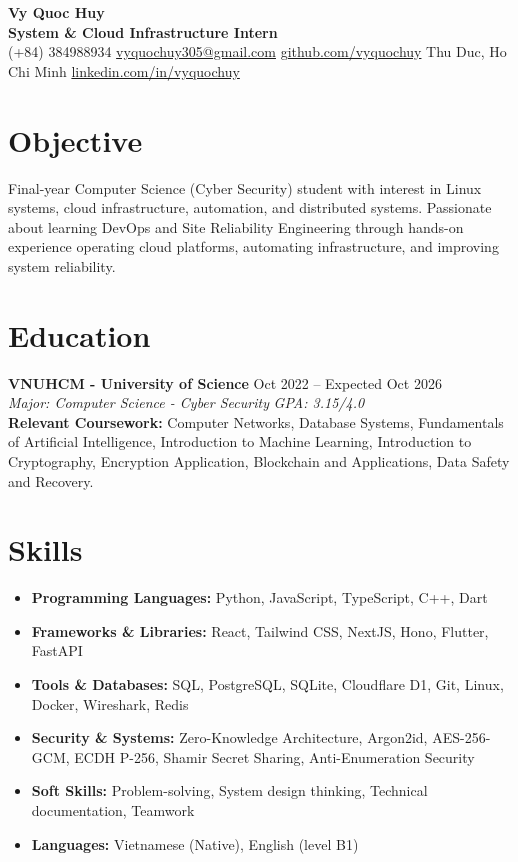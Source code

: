 \documentclass[10pt,a4paper]{article}
\begin{document}
\pagestyle{empty}

\begin{center}
    {\huge \textbf{Vy Quoc Huy}} \\ \vspace{4pt}
    {\Large \textbf{System & Cloud Infrastructure Intern}} \\ \vspace{4pt}
    (+84) 384988934 \quad \href{mailto:vyquochuy305@gmail.com}{vyquochuy305@gmail.com} \quad \href{https://github.com/vyquochuy}{github.com/vyquochuy} \quad Thu Duc, Ho Chi Minh \quad \href{https://www.linkedin.com/in/vyquochuy/}{linkedin.com/in/vyquochuy}
\end{center}

\section*{Objective}
Final-year Computer Science (Cyber Security) student with interest in Linux systems, cloud infrastructure, automation, and distributed systems. Passionate about learning DevOps and Site Reliability Engineering through hands-on experience operating cloud platforms, automating infrastructure, and improving system reliability.

\section*{Education}
\noindent \textbf{VNUHCM - University of Science} \hfill Oct 2022 -- Expected Oct 2026\\
\textit{Major: Computer Science - Cyber Security} \hfill \textit{GPA: 3.15/4.0}\\
\textbf{Relevant Coursework:} Computer Networks, Database Systems, Fundamentals of Artificial Intelligence, Introduction to Machine Learning, Introduction to Cryptography, Encryption Application, Blockchain and Applications, Data Safety and Recovery.

\section*{Skills}
\begin{itemize}[leftmargin=0.15in, label={}, itemsep=0pt]
    \item \textbf{Programming Languages:} Python, JavaScript, TypeScript, C++, Dart
    \item \textbf{Frameworks \& Libraries:} React, Tailwind CSS, NextJS, Hono, Flutter, FastAPI
    \item \textbf{Tools \& Databases:} SQL, PostgreSQL, SQLite, Cloudflare D1, Git, Linux, Docker, Wireshark, Redis
    \item \textbf{Security \& Systems:} Zero-Knowledge Architecture, Argon2id, AES-256-GCM, ECDH P-256, Shamir Secret Sharing, Anti-Enumeration Security
    \item \textbf{Soft Skills:} Problem-solving, System design thinking, Technical documentation, Teamwork
    \item \textbf{Languages:} Vietnamese (Native), English (level B1)
\end{itemize}
\end{document}
